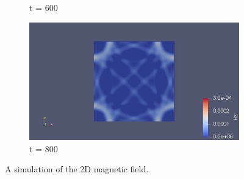\begin{figure}
\begin{subfigure}{.49\textwidth}
		\caption{t = 600}
	\end{subfigure}
	\begin{subfigure}{.49\textwidth}
		\centering
		\includegraphics[width=.95\linewidth]{Figures/FDTD2DH4}
		\caption{t = 800}
	\end{subfigure}
	\decoRule
	\caption[2D Magnetic Field Simulation]{A simulation of the 2D magnetic field.}
	\label{fig:FDTD2DH}
\end{figure}